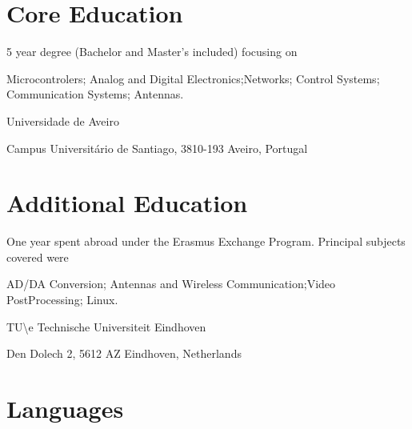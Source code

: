 








\section*{Core Education}


{
5 year degree (Bachelor and Master's included) focusing on

Microcontrolers; Analog and Digital Electronics;Networks; Control Systems;
Communication Systems; Antennas.
}


{
Universidade de Aveiro

Campus Universitário de Santiago, 3810-193 Aveiro, Portugal
}

\section*{Additional Education}


{
One year spent abroad under the Erasmus Exchange Program. Principal subjects
covered were

AD/DA Conversion; Antennas and Wireless Communication;Video PostProcessing;
Linux.
}

{
TU\textbackslash e Technische Universiteit Eindhoven

Den Dolech 2, 5612 AZ Eindhoven, Netherlands
}

\section*{Languages}

